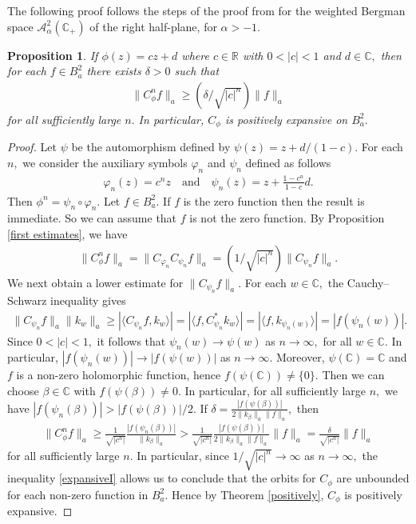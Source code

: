 \documentclass[11pt]{amsart}%
\numberwithin{equation}{section}
\theoremstyle{plain}
\newtheorem{prop}[thm]{Proposition}
\theoremstyle{definition}
\theoremstyle{definition}
\begin{document}
The following proof follows the steps of the proof from \cite[Lemma 3.2]{blois2025dynamics} for the weighted Bergman space $\mathcal{A}^2_{\alpha}(\mathbb{C}_+)$ of the right half-plane, for $\alpha>-1.$

\begin{prop}\label{second estimates} If $\phi(z)=cz+d$ where $c\in \mathbb{R}$ with $0<|c|<1$ and $d\in \mathbb{C},$ then for each $f\in B^2_a$ there exists $\delta>0$ such that 
\begin{align}\label{inequality}
\|C_{\phi}^nf\|_{a}\geq (\delta/\sqrt{|c|^n})\|f\|_{a}
\end{align}
for all sufficiently large $n.$ In particular, $C_{\phi}$ is positively expansive on $B^2_a.$
\end{prop}
\begin{proof}
Let $\psi$ be the automorphism defined by $\psi(z)=z+d/(1-c).$ For each $n,$ we consider the auxiliary symbols $\varphi_n$ and $\psi_n$ defined as follows
\begin{align*}
\varphi_n(z)=c ^nz  \quad \text{and} \quad \psi_n(z)=z+\frac{1-c ^n}{1-c }d.
\end{align*}
Then $\phi^{n}=\psi_n\circ \varphi_n.$ Let $f\in B^2_a.$ If $f$ is the zero function then the result is immediate. So we can assume that $f$ is not the zero function. By Proposition \ref{first estimates}, we have
\begin{align*}
\|C_{\phi}^nf\|_{a}=\|C_{\varphi_n}C_{\psi_n}f\|_{a}= (1/\sqrt{|c|^n})\|C_{\psi_n}f\|_{a}.
\end{align*}
We next obtain a lower estimate for $\|C_{\psi_n}f\|_{a}.$ For each $w\in \mathbb{C},$ the Cauchy--Schwarz inequality gives
\begin{align*}
\|C_{\psi_n}f\|_{a}\|k_w\|_{a}\geq |\langle C_{\psi_n}f, k_w\rangle|=|\langle f, C_{\psi_n}^*k_w\rangle|=|\langle f, k_{\psi_n(w)}\rangle|=|f(\psi_n(w))|.
\end{align*}
Since $0<|c|<1,$ it follows that $\psi_n(w)\rightarrow \psi(w)$ as $n\rightarrow \infty,$ for all $w\in \mathbb{C}.$ In particular, $|f(\psi_n(w))|\rightarrow |f(\psi(w))|$ as $n\rightarrow \infty.$ Moreover, $\psi(\mathbb{C})=\mathbb{C}$ and $f$ is a non-zero holomorphic function, hence $f(\psi(\mathbb{C}))\neq\{0\}.$ Then we can choose $\beta\in \mathbb{C}$ with $f(\psi(\beta))\neq 0.$  In particular, for all sufficiently large $n,$ we have
$|f(\psi_n(\beta))|>|f(\psi(\beta))|/2.$ If $\delta=\frac{|f(\psi(\beta))|}{2\|k_{\beta}\|_{a}\|f\|_{a}},$ then
\begin{align}\label{expansiveI}
\|C_{\phi}^nf\|_a\geq \frac{1}{\sqrt{|c^n|}}\frac{|f(\psi_n(\beta))|}{\|k_{\beta}\|_a}>\frac{1}{\sqrt{|c^n|}}\frac{|f(\psi(\beta))|}{2\|k_{\beta}\|_a\|f\|_a}\|f\|_a=\frac{\delta}{\sqrt{|c^n|}}\|f\|_a
\end{align}
for all sufficiently large $n.$ In particular, since $1/\sqrt{|c|^n}\to \infty$ as $n\to \infty,$ the inequality \eqref{expansiveI} allows us to conclude that the orbits for $C_{\phi}$ are unbounded for each non-zero function in $B^2_a.$ Hence by  Theorem \ref{positively}, $C_{\phi}$ is positively expansive.
\end{proof}
\end{document}
